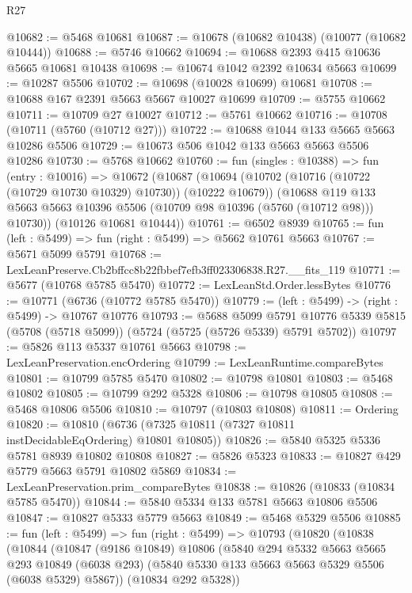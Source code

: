 \begin{lexlean}{R27}
\begin{coremodule}
@10682 := @5468 @10681
@10687 := @10678 (@10682 @10438) (@10077 (@10682 @10444))
@10688 := @5746 @10662
@10694 := @10688 @2393 @415 @10636 @5665 @10681 @10438
@10698 := @10674 @1042 @2392 @10634 @5663
@10699 := @10287 @5506
@10702 := @10698 (@10028 @10699) @10681
@10708 := @10688 @167 @2391 @5663 @5667 @10027 @10699
@10709 := @5755 @10662
@10711 := @10709 @27 @10027
@10712 := @5761 @10662
@10716 := @10708 (@10711 (@5760 (@10712 @27)))
@10722 := @10688 @1044 @133 @5665 @5663 @10286 @5506
@10729 := @10673 @506 @1042 @133 @5663 @5663 @5506 @10286
@10730 := @5768 @10662
@10760 := fun (singles : @10388) =>
  fun (entry : @10016) =>
  @10672
    (@10687
      (@10694
        (@10702 (@10716 (@10722 (@10729 @10730 @10329) @10730)) (@10222 @10679))
        (@10688 @119 @133 @5663 @5663 @10396 @5506 (@10709 @98 @10396 (@5760 (@10712 @98))) @10730))
      (@10126 @10681 @10444))
@10761 := @6502 @8939
@10765 := fun (left : @5499) => fun (right : @5499) => @5662 @10761 @5663
@10767 := @5671 @5099 @5791
@10768 := LexLeanPreserve.Cb2bffcc8b22fbbef7efb3ff023306838.R27.__fits_119
@10771 := @5677 (@10768 @5785 @5470)
@10772 := LexLeanStd.Order.lessBytes
@10776 := @10771 (@6736 (@10772 @5785 @5470))
@10779 := (left : @5499) -> (right : @5499) -> @10767 @10776
@10793 := @5688
    @5099
    @5791
    @10776
    @5339
    @5815
    (@5708 (@5718 @5099))
    (@5724 (@5725 (@5726 @5339) @5791 @5702))
@10797 := @5826 @113 @5337 @10761 @5663
@10798 := LexLeanPreservation.encOrdering
@10799 := LexLeanRuntime.compareBytes
@10801 := @10799 @5785 @5470
@10802 := @10798 @10801
@10803 := @5468 @10802
@10805 := @10799 @292 @5328
@10806 := @10798 @10805
@10808 := @5468 @10806 @5506
@10810 := @10797 (@10803 @10808)
@10811 := Ordering
@10820 := @10810 (@6736 (@7325 @10811 (@7327 @10811 instDecidableEqOrdering) @10801 @10805))
@10826 := @5840 @5325 @5336 @5781 @8939 @10802 @10808
@10827 := @5826 @5323
@10833 := @10827 @429 @5779 @5663 @5791 @10802 @5869
@10834 := LexLeanPreservation.prim_compareBytes
@10838 := @10826 (@10833 (@10834 @5785 @5470))
@10844 := @5840 @5334 @133 @5781 @5663 @10806 @5506
@10847 := @10827 @5333 @5779 @5663
@10849 := @5468 @5329 @5506
@10885 := fun (left : @5499) =>
  fun (right : @5499) =>
  @10793
    (@10820
      (@10838
        (@10844
          (@10847
            (@9186 @10849)
            @10806
            (@5840
              @294
              @5332
              @5663
              @5665
              @293
              @10849
              (@6038 @293)
              (@5840 @5330 @133 @5663 @5663 @5329 @5506 (@6038 @5329) @5867))
            (@10834 @292 @5328))

\end{coremodule}
\end{lexlean}
